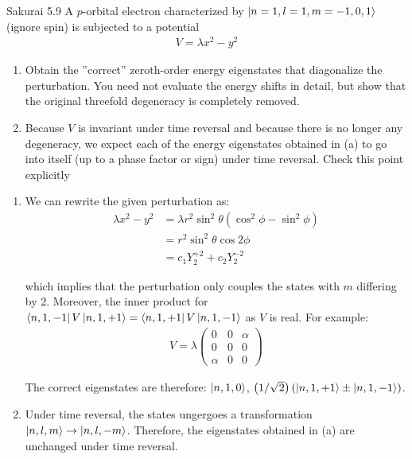 \documentclass{article}
\begin{document}
	\newpage
	\begin{section}{Sakurai 5.9}
		A $p$-orbital electron characterized by $\ket{n = 1, l = 1, m = -1, 0, 1}$ (ignore spin) is subjected to a potential
		\begin{align*}
			V = \lambda{x^2 - y^2}
		\end{align*}
		\begin{enumerate}
			\item Obtain the ''correct'' zeroth-order energy eigenstates that diagonalize the perturbation. You need not evaluate the energy shifts in detail, but show that the original threefold degeneracy is completely removed.
			\item Because $V$ is invariant under time reversal and because there is no longer any degeneracy, we expect each of the energy eigenstates obtained in (a) to go into itself (up to a phase factor or sign) under time reversal. Check this point explicitly
		\end{enumerate}

		\begin{tcolorbox}[breakable]
			\begin{enumerate}
				\item We can rewrite the given perturbation as:
				\begin{align*}
				\lambda{x^2 - y^2} &= \lambda r^2 \sin^2\theta (\cos^2\phi - \sin^2\phi) \\
				&= r^2\sin^2\theta \cos2\phi \\
				&= c_1 Y_2^{+2} + c_2 Y_2^{-2}
				\end{align*}

				which implies that the perturbation only couples the states with $m$ differing by 2. Moreover, the inner product for $\bra{n,1,-1}V\ket{n,1,+1} = \bra{n,1,+1}V\ket{n,1,-1}$ as $V$ is real. For example:
				\begin{align*}
					V = \lambda \begin{pmatrix}
						0 & 0 & \alpha \\
						0 & 0 & 0 \\
						\alpha & 0 & 0
					\end{pmatrix}
				\end{align*}

				The correct eigenstates are therefore: $\ket{n,1,0}$, $\left( 1/\sqrt{2} \right) (\ket{n,1,+1} \pm \ket{n,1,-1})$.

				\item Under time reversal, the states ungergoes a transformation $\ket{n,l,m} \to \ket{n,l,-m}$. Therefore, the eigenstates obtained in (a) are unchanged under time reversal. 
			\end{enumerate}
		\end{tcolorbox}
	\end{section}
\end{document}
